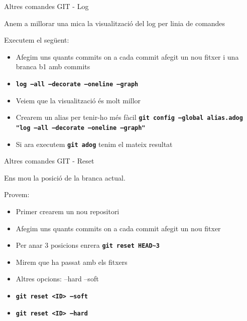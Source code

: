 \documentclass[10pt,xcolor={rgb}]{beamer}
\begin{document}
    \begin{frame}[fragile]{Altres comandes GIT - Log}

      Anem a millorar una mica la visualització del log per linia de comandes
      \begin{block}{Executem el següent:}
      \begin{itemize}
        \item Afegim uns quants commits on a cada commit afegit un nou fitxer i una branca b1 amb commits
        \item \texttt{\textbf{log --all --decorate --oneline --graph}}
        \item Veiem que la visualització és molt millor
        \item Crearem un alias per tenir-ho més fàcil \texttt{\textbf{git config --global alias.adog "log --all --decorate --oneline --graph"}}
        \item Si ara executem \texttt{\textbf{git adog}} tenim el mateix resultat
      \end{itemize}
      \end{block}
    \end{frame}

    \begin{frame}[fragile]{Altres comandes GIT - Reset}

      Ens mou la posició de la branca actual.  
      \begin{block}{Provem:}
      \begin{itemize}
        \item Primer crearem un nou repositori
        \item Afegim uns quants commits on a cada commit afegit un nou fitxer
        \item Per anar 3 posicions enrera \texttt{\textbf{git reset HEAD\textasciitilde{}3}}
        \item Mirem que ha passat amb els fitxers
        \item Altres opcions:  --hard --soft
        \item \texttt{\textbf{git reset <ID> --soft}}
        \item \texttt{\textbf{git reset <ID> --hard}}
      \end{itemize}
      \end{block}
    \end{frame}
\end{document}

